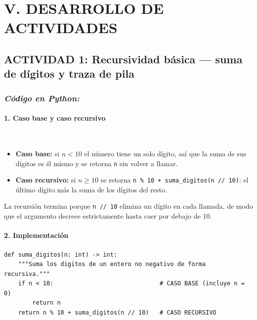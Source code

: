 \documentclass[12pt,a4paper]{article}
\begin{document}
\newpage
\section*{V. DESARROLLO DE ACTIVIDADES}

\subsection*{ACTIVIDAD 1: Recursividad básica --- suma de dígitos y traza de pila}

\subsubsection*{\textit{Código en Python:}}

\paragraph{1. Caso base y caso recursivo}\mbox{}\\[4pt]

\begin{itemize}[leftmargin=*]
    \item \textbf{Caso base:} si $n < 10$ el número tiene un solo dígito, así que la
    suma de sus dígitos es él mismo y se retorna \texttt{n} sin volver a llamar.
    \item \textbf{Caso recursivo:} si $n \geq 10$ se retorna
    \texttt{n \% 10 + suma\_digitos(n // 10)}: el último dígito más la suma de los
    dígitos del resto.
\end{itemize}

La recursión termina porque \texttt{n // 10} elimina un dígito en cada llamada, de modo
que el argumento decrece estrictamente hasta caer por debajo de 10.

\paragraph{2. Implementación}\mbox{}

\begin{lstlisting}[style=python,caption={\texttt{suma\_digitos(n)} --- versión recursiva.}]
def suma_digitos(n: int) -> int:
    """Suma los digitos de un entero no negativo de forma recursiva."""
    if n < 10:                              # CASO BASE (incluye n = 0)
        return n
    return n % 10 + suma_digitos(n // 10)   # CASO RECURSIVO
\end{lstlisting}
\end{document}

